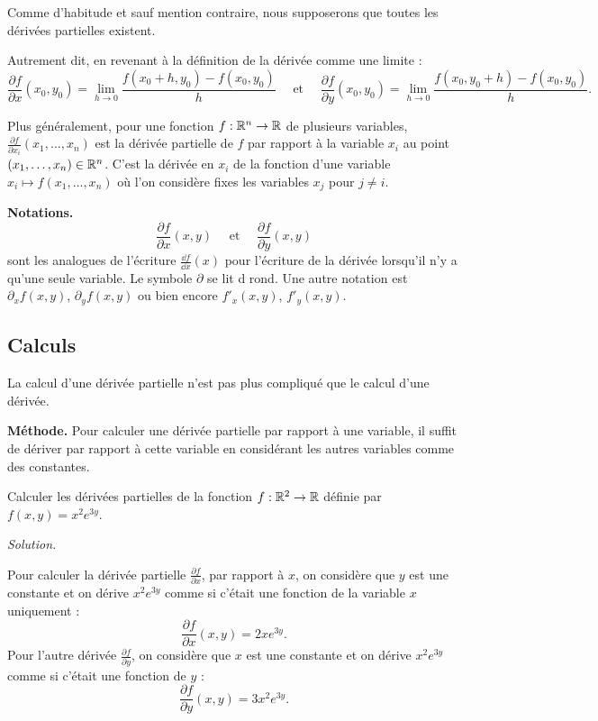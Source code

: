 Comme d'habitude et sauf mention contraire, nous supposerons que toutes les dérivées partielles existent.

Autrement dit, en revenant à la définition de la dérivée comme une limite :
$$\frac{\partial f}{\partial x} (x_0,y_0) = \lim_{h \rightarrow 0} 
\frac{f(x_0+h, y_0) - f(x_0,y_0)}{h}
\quad \text{ et } \quad 
\frac{\partial f}{\partial y} (x_0,y_0) = \lim_{h \rightarrow 0} 
\frac{f(x_0, y_0+h) - f(x_0,y_0)}{h}.$$




Plus généralement, pour une fonction $f : \mathbb{R}^n \to \mathbb{R}$ de plusieurs variables,
$\frac{\partial f}{\partial x_i} (x_1,\ldots,x_n)$ est la dérivée partielle de $f$ par rapport à la variable $x_i$ au point $(x_1,\ldots,x_n) \in \mathbb{R}^n$.
C'est la dérivée en $x_i$ de la fonction d'une variable $x_i \mapsto f(x_1,\ldots,x_n)$ où l'on considère fixes les variables $x_j$ pour $j \neq i$.

\bigskip

\textbf{Notations.}
$$\frac{\partial f}{\partial x} (x,y) \quad \text{ et } \quad \frac{\partial f}{\partial y} (x,y)$$
sont les analogues de l'écriture $\frac{\dd f}{\dd x}(x)$ pour l'écriture de la dérivée lorsqu'il n'y a qu'une seule variable.
Le symbole \og{}$\partial$\fg{} se lit \og{}d rond\fg{}.
Une autre notation est $\partial_x f(x,y)$, $\partial_y f(x,y)$ ou bien encore $f'_x (x,y)$, $f'_y (x,y)$.








\subsection{Calculs}

La calcul d'une dérivée partielle n'est pas plus compliqué que le calcul d'une dérivée.

\textbf{Méthode.}
Pour calculer une dérivée partielle par rapport à une variable, il suffit de dériver par rapport à cette variable en considérant les autres variables comme des constantes.


\begin{exemple}{}{}
	Calculer les dérivées partielles de la fonction 
	$f : \mathbb{R}^2 \to \mathbb{R}$ définie par $f(x,y)=x^2e^{3y}$.
	
	\medskip
	\emph{Solution.}
	
	Pour calculer la dérivée partielle $\frac{\partial f}{\partial x}$, par rapport à $x$, on considère que $y$ est une constante et on dérive $x^2e ^{3y}$ comme si c'était une fonction de la variable $x$ uniquement :
	$$\frac{\partial f}{\partial x}(x,y) =2xe ^{3y}.$$
	Pour l'autre dérivée  $\frac{\partial f}{\partial y}$, on considère que $x$ est une constante et on dérive $x^2e ^{3y}$ comme si c'était une fonction de $y$ :
	$$\frac{\partial f}{\partial y}(x,y) = 3x^2e ^{3y}.$$
\end{exemple}



